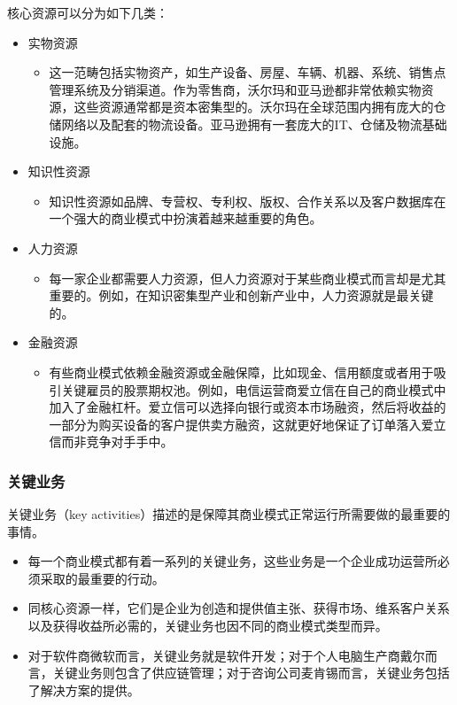 	核心资源可以分为如下几类：
	\begin{itemize}
		\item 实物资源
		\begin{itemize}
			\item 这一范畴包括实物资产，如生产设备、房屋、车辆、机器、系统、销售点管理系统及分销渠道。作为零售商，沃尔玛和亚马逊都非常依赖实物资源，这些资源通常都是资本密集型的。沃尔玛在全球范围内拥有庞大的仓储网络以及配套的物流设备。亚马逊拥有一套庞大的IT、仓储及物流基础设施。
		\end{itemize}
		\item 知识性资源
		\begin{itemize}
			\item 知识性资源如品牌、专营权、专利权、版权、合作关系以及客户数据库在一个强大的商业模式中扮演着越来越重要的角色。
		\end{itemize}
		\item 人力资源
		\begin{itemize}
			\item 每一家企业都需要人力资源，但人力资源对于某些商业模式而言却是尤其重要的。例如，在知识密集型产业和创新产业中，人力资源就是最关键的。
		\end{itemize}
		\item 金融资源
		\begin{itemize}
			\item 有些商业模式依赖金融资源或金融保障，比如现金、信用额度或者用于吸引关键雇员的股票期权池。例如，电信运营商爱立信在自己的商业模式中加入了金融杠杆。爱立信可以选择向银行或资本市场融资，然后将收益的一部分为购买设备的客户提供卖方融资，这就更好地保证了订单落入爱立信而非竞争对手手中。
		\end{itemize}
	\end{itemize}


	\subsubsection{关键业务}
	关键业务（key activities）描述的是保障其商业模式正常运行所需要做的最重要的事情。
	\begin{itemize}
		\item 每一个商业模式都有着一系列的关键业务，这些业务是一个企业成功运营所必须采取的最重要的行动。
		\item 同核心资源一样，它们是企业为创造和提供值主张、获得市场、维系客户关系以及获得收益所必需的，关键业务也因不同的商业模式类型而异。
		\item 对于软件商微软而言，关键业务就是软件开发；对于个人电脑生产商戴尔而言，关键业务则包含了供应链管理；对于咨询公司麦肯锡而言，关键业务包括了解决方案的提供。
	\end{itemize}

